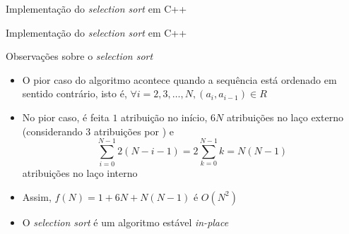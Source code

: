 \begin{frame}[fragile]{Implementação do \textit{selection sort} em C++}
\end{frame}

\begin{frame}[fragile]{Implementação do \textit{selection sort} em C++}
\end{frame}

\begin{frame}[fragile]{Observações sobre o \textit{selection sort}}

    \begin{itemize}
        \item O pior caso do algoritmo acontece quando a sequência está ordenado em sentido 
            contrário, isto é, $\forall i = 2, 3, \ldots, N, (a_i, a_{i - 1})\in R$

        \item No pior caso, é feita $1$ atribuição no início, $6N$ atribuições no laço externo 
            (considerando 3 atribuições por ) e
            \[
                \sum_{i = 0}^{N - 1} 2(N - i - 1) = 2\sum_{k = 0}^{N - 1} k = N(N - 1)
            \]
            atribuições no laço interno

        \item Assim, $f(N) = 1 + 6N + N(N - 1)$ é $O(N^2)$

        \item O \textit{selection sort} é um algoritmo estável \textit{in-place}
    \end{itemize}

\end{frame}
